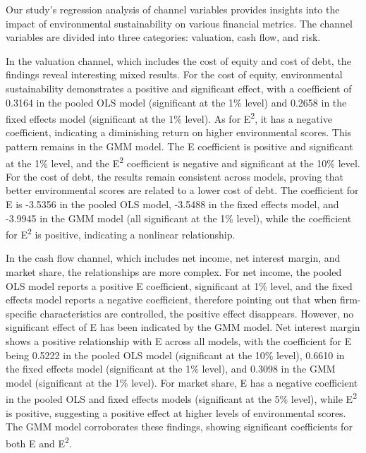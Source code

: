 \documentclass[11pt, a4paper]{article}
\begin{document}
Our study's regression analysis of channel variables provides insights into the impact of environmental sustainability on various financial metrics. The channel variables are divided into three categories: valuation, cash flow, and risk. 

In the valuation channel, which includes the cost of equity and cost of debt, the findings reveal interesting mixed results. For the cost of equity, environmental sustainability demonstrates a positive and significant effect, with a coefficient of 0.3164 in the pooled OLS model (significant at the 1\% level) and 0.2658 in the fixed effects model (significant at the 1\% level). As for E\textsuperscript{2}, it has a negative coefficient, indicating a diminishing return on higher environmental scores. This pattern remains in the GMM model. The E coefficient is positive and significant at the 1\% level, and the E\textsuperscript{2} coefficient is negative and significant at the 10\% level. For the cost of debt, the results remain consistent across models, proving that better environmental scores are related to a lower cost of debt. The coefficient for E is -3.5356 in the pooled OLS model, -3.5488 in the fixed effects model, and -3.9945 in the GMM model (all significant at the 1\% level), while the coefficient for E\textsuperscript{2} is positive, indicating a nonlinear relationship.

In the cash flow channel, which includes net income, net interest margin, and market share, the relationships are more complex. For net income, the pooled OLS model reports a positive E coefficient, significant at 1\% level, and the fixed effects model reports a negative coefficient, therefore pointing out that when firm-specific characteristics are controlled, the positive effect disappears. However, no significant effect of E has been indicated by the GMM model. Net interest margin shows a positive relationship with E across all models, with the coefficient for E being 0.5222 in the pooled OLS model (significant at the 10\% level), 0.6610 in the fixed effects model (significant at the 1\% level), and 0.3098 in the GMM model (significant at the 1\% level).  For market share, E has a negative coefficient in the pooled OLS and fixed effects models (significant at the 5\% level), while E\textsuperscript{2} is positive, suggesting a positive effect at higher levels of environmental scores. The GMM model corroborates these findings, showing significant coefficients for both E and E\textsuperscript{2}.
\end{document}
